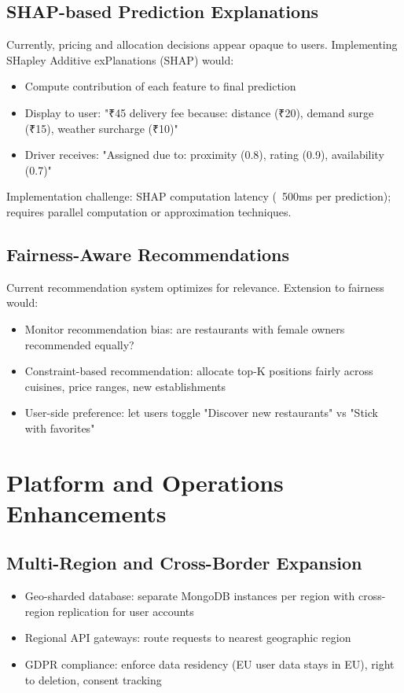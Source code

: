\documentclass[12pt,a4paper]{report}
\begin{document}
\begin{itemize}
\subsection{SHAP-based Prediction Explanations}

Currently, pricing and allocation decisions appear opaque to users. Implementing SHapley Additive exPlanations (SHAP) would:
\begin{itemize}
    \item Compute contribution of each feature to final prediction
    \item Display to user: "₹45 delivery fee because: distance (₹20), demand surge (₹15), weather surcharge (₹10)"
    \item Driver receives: "Assigned due to: proximity (0.8), rating (0.9), availability (0.7)"
\end{itemize}

Implementation challenge: SHAP computation latency (~500ms per prediction); requires parallel computation or approximation techniques.

\subsection{Fairness-Aware Recommendations}

Current recommendation system optimizes for relevance. Extension to fairness would:
\begin{itemize}
    \item Monitor recommendation bias: are restaurants with female owners recommended equally?
    \item Constraint-based recommendation: allocate top-K positions fairly across cuisines, price ranges, new establishments
    \item User-side preference: let users toggle "Discover new restaurants" vs "Stick with favorites"
\end{itemize}

\section{Platform and Operations Enhancements}

\subsection{Multi-Region and Cross-Border Expansion}

\begin{itemize}
    \item Geo-sharded database: separate MongoDB instances per region with cross-region replication for user accounts
    \item Regional API gateways: route requests to nearest geographic region
    \item GDPR compliance: enforce data residency (EU user data stays in EU), right to deletion, consent tracking
\end{itemize}


\end{itemize}
\end{document}
